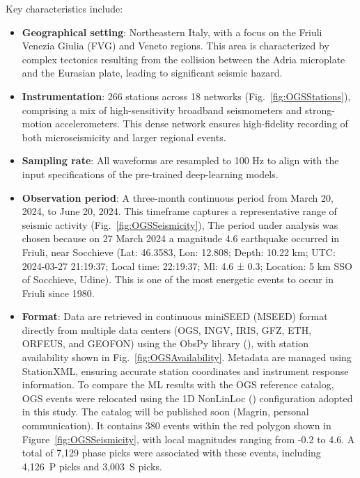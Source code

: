 Key characteristics include:
\begin{itemize}
  \item \textbf{Geographical setting}: Northeastern Italy, with a focus on the
    Friuli Venezia Giulia (FVG) and Veneto regions. This area is characterized
    by complex tectonics resulting from the collision between the Adria
    microplate and the Eurasian plate, leading to significant seismic hazard.
  \item \textbf{Instrumentation}: 266 stations across 18 networks
    (Fig.~\ref{fig:OGSStations}), comprising a mix of high-sensitivity
    broadband seismometers and strong-motion accelerometers. This dense network
    ensures high-fidelity recording of both microseismicity and larger regional
    events.
  \item \textbf{Sampling rate}: All waveforms are resampled to 100 Hz to align
    with the input specifications of the pre-trained deep-learning models.
  \item \textbf{Observation period}: A three-month continuous period from
    March 20, 2024, to June 20, 2024. This timeframe captures a representative
    range of seismic activity (Fig.~\ref{fig:OGSSeismicity}), The period under
    analysis was chosen because on 27 March 2024 a magnitude 4.6 earthquake
    occurred in Friuli, near Socchieve (Lat: 46.3583, Lon: 12.808; Depth: 10.22
      km; UTC: 2024-03-27 21:19:37; Local time: 22:19:37; Ml: 4.6 ± 0.3;
    Location: 5 km SSO of Socchieve, Udine). This is one of the most energetic
    events to occur in Friuli since 1980.
  \item \textbf{Format}: Data are retrieved in continuous miniSEED (MSEED)
    format directly from multiple data centers (OGS, INGV, IRIS, GFZ, ETH,
    ORFEUS, and GEOFON) using the ObsPy library (\cite{ObsPy}), with station
    availability shown in Fig.~\ref{fig:OGSAvailability}. Metadata are managed
    using StationXML, ensuring accurate station coordinates and instrument
    response information. To compare the ML results with the OGS reference
    catalog, OGS events were relocated using the 1D NonLinLoc
    (\cite{NonLinLoc}) configuration adopted in this study. The catalog will be
    published soon (Magrin, personal communication). It contains 380 events
    within the red polygon shown in Figure~\ref{fig:OGSSeismicity}, with local
    magnitudes ranging from -0.2 to 4.6. A total of 7,129 phase picks were
    associated with these events, including 4,126~P picks and 3,003~S picks.
\end{itemize}

